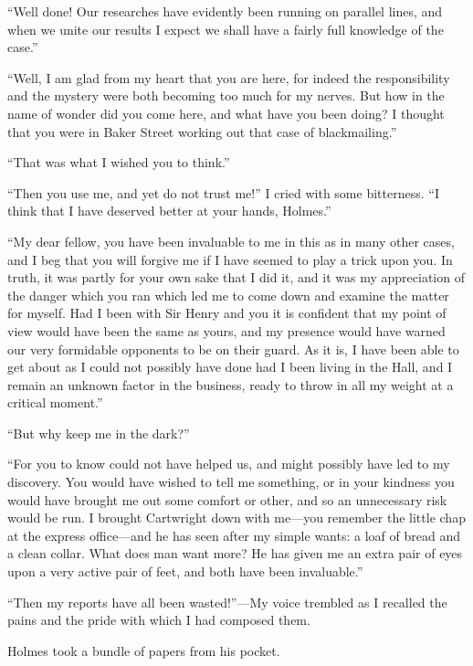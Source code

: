 \documentclass[paper=5.5in:8.5in,BCOR=7mm,twoside,DIV=calc,12pt,usegeometry,openany,chapterprefix,endperiod]{scrbook} %
\begin{document}
\enquote{Well done! Our researches have evidently been running on parallel lines, and when we unite our results I expect we shall have a fairly full knowledge of the case.}

\enquote{Well, I am glad from my heart that you are here, for indeed the responsibility and the mystery were both becoming too much for my nerves. But how in the name of wonder did you come here, and what have you been doing? I thought that you were in Baker Street working out that case of blackmailing.}

\enquote{That was what I wished you to think.}

\enquote{Then you use me, and yet do not trust me!} I cried with some bitterness. \enquote{I think that I have deserved better at your hands, \newline Holmes.}

\enquote{My dear fellow, you have been invaluable to me in this as in many other cases, and I beg that you will forgive me if I have seemed to play a trick upon you. In truth, it was partly for your own sake that I did it, and it was my appreciation of the danger which you ran which led me to come down and examine the matter for myself. Had I been with Sir Henry and you it is confident that my point of view would have been the same as yours, and my presence would have warned our very formidable opponents to be on their guard. As it is, I have been able to get about as I could not possibly have done had I been living in the Hall, and I remain an unknown factor in the business, ready to throw in all my weight at a critical moment.}

\enquote{But why keep me in the dark?}

\enquote{For you to know could not have helped us, and might possibly have led to my discovery. You would have wished to tell me something, or in your kindness you would have brought me out some comfort or other, and so an unnecessary risk would be run. I brought Cartwright down with me\nobreakdash---you remember the little chap at the express office\nobreakdash---and he has seen after my simple wants: a loaf of bread and a clean collar. What does man want more? He has given me an extra pair of eyes upon a very active pair of feet, and both have been invaluable.}

\enquote{Then my reports have all been wasted!}\nobreakdash---My voice trembled as I recalled the pains and the pride with which I had composed them.

Holmes took a bundle of papers from his pocket.
\end{document}
